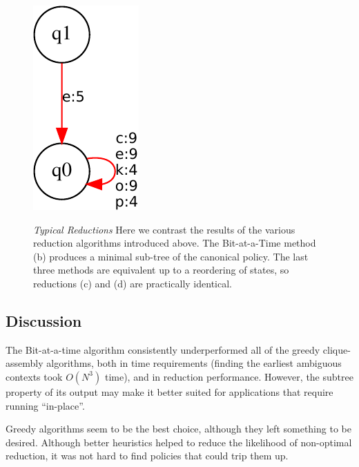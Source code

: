 \begin{figure}
{\includegraphics[scale=0.3, angle=35]{exact.pdf}
}
\caption{\emph{Typical Reductions}
Here we contrast the results of the various reduction algorithms introduced above.
The Bit-at-a-Time method (b) produces a minimal sub-tree of
the canonical policy.
The last three methods are equivalent up to a reordering of states,
so reductions (c) and (d) are practically identical. 
}
\end{figure}
\subsection{Discussion}
The Bit-at-a-time algorithm consistently underperformed all of the greedy clique-assembly
algorithms, both in time requirements (finding the earliest ambiguous
contexts took $O(N^3)$ time), and in reduction performance.  However, the 
subtree property of its output may make it better suited for applications
that require running ``in-place''.

Greedy algorithms seem to be the best choice, although they left something to be desired.
Although better heuristics helped to reduce the likelihood of non-optimal reduction,
it was not hard to find policies that could trip them up.

